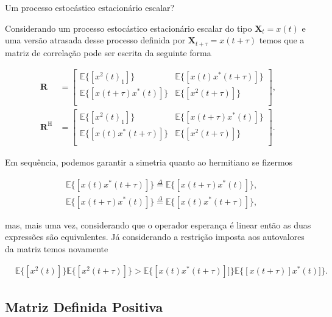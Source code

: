  Um processo estocástico estacionário escalar?



Considerando um processo estocástico estacionário escalar do tipo $\mathbf{X}_{t} = x(t)$ e uma versão atrasada desse
processo definida por $\mathbf{X}_{t + \tau} = x(t + \tau)$ temos que a matriz de correlação pode ser escrita da seguinte forma

\begin{align}
    \mathbf{R} &= \left[ 
    \begin{matrix}
        \mathbb{E}\{[x^{2}(t)_{1}]\} & \mathbb{E}\{[x(t)x^{*}(t + \tau)]\} \\
        \mathbb{E}\{[x(t + \tau)x^{*}(t)]\} & \mathbb{E}\{[x^{2}(t + \tau)]\} \\
    \end{matrix} \right], \\
    \mathbf{R}^{\text{H}} &= \left[ 
    \begin{matrix}
        \mathbb{E}\{[x^{2}(t)_{1}]\} & \mathbb{E}\{[x(t + \tau)x^{*}(t)]\} \\
        \mathbb{E}\{[x(t)x^{*}(t + \tau)]\} & \mathbb{E}\{[x^{2}(t + \tau)]\} \\
    \end{matrix} \right].
\end{align}


Em sequência, podemos garantir a simetria quanto ao hermitiano se fizermos 

\begin{align}
    &\mathbb{E}\{[x(t)x^{*}(t + \tau)]\} \overset{\Delta}{=} \mathbb{E}\{[x(t + \tau)x^{*}(t)]\}, \\
    &\mathbb{E}\{[x(t + \tau)x^{*}(t)]\} \overset{\Delta}{=} \mathbb{E}\{[x(t)x^{*}(t + \tau)]\},
\end{align}

mas, mais uma vez, considerando que o operador esperança é linear então as duas expressões são equivalentes. Já considerando a
restrição imposta aos autovalores da matriz temos novamente

\begin{align}
    &\mathbb{E}\{[x^{2}(t)]\} \mathbb{E}\{[x^{2}(t + \tau)]\} > \mathbb{E}\{[x(t)x^{*}(t + \tau)]]\}  \mathbb{E}\{[x(t + \tau)]x^{*}(t)]\}.
\end{align}
    

\subsection{Matriz Definida Positiva} %

